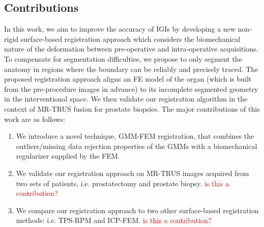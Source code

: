 \documentclass[journal]{IEEEtran}
\newcommand{\comment}[1]{\textcolor{red}{#1}}
\begin{document}
\subsection{Contributions}
In this work, we aim to improve the accuracy of IGIs by developing a new non-rigid surface-based registration approach which considers the biomechanical nature of the deformation between pre-operative and intra-operative acquisitions. To compensate for segmentation difficulties, we propose to only segment the anatomy in regions where the boundary can be reliably and precisely traced. The proposed registration approach aligns an FE model of the organ (which is built from the pre-procedure images in advance) to its incomplete segmented geometry in the interventional space. We then validate our registration algorithm in the context of MR-TRUS fusion for prostate biopsies. The major contributions of this work are as follows:
\begin{enumerate}
	\item We introduce a novel technique, GMM-FEM registration, that combines the outliers/missing data rejection properties of the GMMs with a biomechanical regularizer supplied by the FEM.
	\item We validate our registration approach on MR-TRUS images acquired from two sets of patients, i.e. prostatectomy and prostate biopsy. \comment{is this a contribution?}
	\item We compare our registration approach to two other surface-based registration methods: i.e. TPS-RPM and ICP-FEM. \comment{is this a contribution?}
\end{enumerate}

\end{document}
